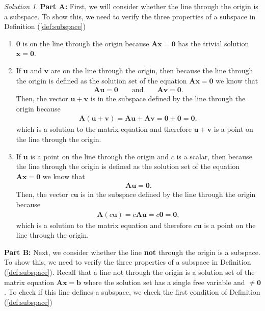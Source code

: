 \documentclass[
]{book}
\theoremstyle{definition}
\theoremstyle{definition}
\theoremstyle{definition}
\theoremstyle{definition}
\theoremstyle{remark}
\newtheorem*{solution}{Solution}
\begin{document}
\begin{solution}

\textbf{Part A:} First, we will consider whether the line through the origin is a subspace. To show this, we need to verify the three properties of a subspace in Definition (\ref{def:subspace})

\begin{enumerate}
\def\labelenumi{\arabic{enumi})}
\item
  \(\mathbf{0}\) is on the line through the origin because \(\mathbf{A} \mathbf{x} = \mathbf{0}\) has the trivial solution \(\mathbf{x} = \mathbf{0}\).
\item
  If \(\mathbf{u}\) and \(\mathbf{v}\) are on the line through the origin, then because the line through the origin is defined as the solution set of the equation \(\mathbf{A} \mathbf{x} = \mathbf{0}\) we know that
  \[
  \begin{aligned}
  \mathbf{A} \mathbf{u} = \mathbf{0} && \mbox{ and } && \mathbf{A} \mathbf{v} = \mathbf{0}.
  \end{aligned}
  \]
  Then, the vector \(\mathbf{u} + \mathbf{v}\) is in the subspace defined by the line through the origin because
  \[
  \begin{aligned}
  \mathbf{A} (\mathbf{u} + \mathbf{v}) = \mathbf{A} \mathbf{u} + \mathbf{A} \mathbf{v} = \mathbf{0} + \mathbf{0} = \mathbf{0},
  \end{aligned}
  \]
  which is a solution to the matrix equation and therefore \(\mathbf{u} + \mathbf{v}\) is a point on the line through the origin.
\item
  If \(\mathbf{u}\) is a point on the line through the origin and \(c\) is a scalar, then because the line through the origin is defined as the solution set of the equation \(\mathbf{A} \mathbf{x} = \mathbf{0}\) we know that
  \[
  \begin{aligned}
  \mathbf{A} \mathbf{u} = \mathbf{0}.
  \end{aligned}
  \]
  Then, the vector \(c \mathbf{u}\) is in the subspace defined by the line through the origin because
  \[
  \begin{aligned}
  \mathbf{A} (c \mathbf{u}) = c \mathbf{A} \mathbf{u}  = c \mathbf{0} = \mathbf{0},
  \end{aligned}
  \]
  which is a solution to the matrix equation and therefore \(c \mathbf{u}\) is a point on the line through the origin.
\end{enumerate}

\textbf{Part B:} Next, we consider whether the line \textbf{not} through the origin is a subspace. To show this, we need to verify the three properties of a subspace in Definition (\ref{def:subspace}). Recall that a line not through the origin is a solution set of the matrix equation \(\mathbf{A} \mathbf{x} = \mathbf{b}\) where the solution set has a single free variable and \(\mathbf \neq \mathbf{0}\). To check if this line defines a subspace, we check the first condition of Definition (\ref{def:subspace})


\end{solution}
\end{document}
